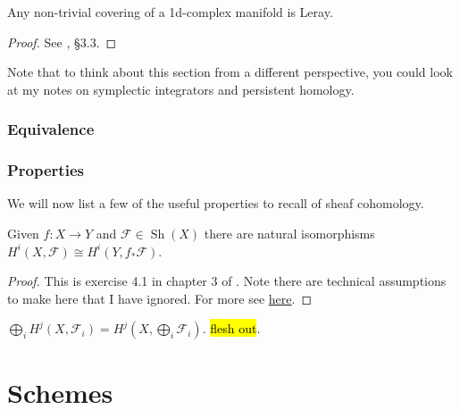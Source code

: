 \documentclass{article}
\begin{document}
\begin{prop}
	Any non-trivial covering of a 1d-complex manifold is Leray.
\end{prop}
\begin{proof}
	See \cite{Ward1991}, \S 3.3. 
\end{proof}

\begin{remark}
	Note that to think about this section from a different perspective, you could look at my notes on symplectic integrators and persistent homology. 
\end{remark}
\subsubsection{Equivalence}

\subsubsection{Properties}
We will now list a few of the useful properties to recall of sheaf cohomology. 

\begin{prop}
	Given $f:X \to Y$ and $\mathcal{F} \in \operatorname{Sh}(X)$ there are natural isomorphisms $H^i(X,\mathcal{F}) \cong H^i(Y,f_\ast \mathcal{F})$. 
\end{prop}
\begin{proof}
	This is exercise 4.1 in chapter 3 of \cite{Hartshorne1977}. Note there are technical assumptions to make here that I have ignored. For more see \href{https://math.stackexchange.com/questions/130493/cohomology-of-quasi-coherent-sheaves-with-respect-to-pushforward-question-exerc}{here}. 
\end{proof}

\begin{prop}
	$\bigoplus_i H^j(X,\mathcal{F}_i) = H^j(X,\bigoplus_i \mathcal{F}_i)$. \hl{flesh out}. 
\end{prop}

\section{Schemes}
\end{document}
